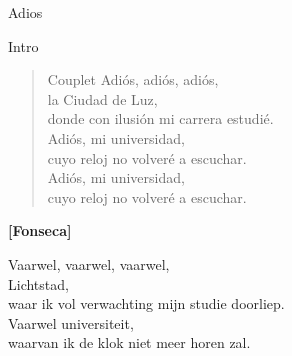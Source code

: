 \begin{song}{Adios}

\begin{instrumental}{Intro}

 \measure{} \measure{} \measure{}  \measure{}    \measure{}  \measure{}  \measure{}  \measure*{}
\end{instrumental}


\begin{verse}{Couplet}
Adiós, adiós, adiós,\\
\chord{}la Ciudad de Luz,\\
donde con ilusión mi carrera estudié.\\
Adiós, mi universidad,\\
cuyo reloj no volveré a escuchar.\\
Adiós, mi universidad,\\
cuyo reloj no volveré a escuchar.\\
\end{verse}
\textbf{[Fonseca]}
\end{song}
\begin{translation}
Vaarwel, vaarwel, vaarwel,\\
Lichtstad,\\
waar ik vol verwachting mijn studie doorliep.\\
Vaarwel universiteit,\\
waarvan ik de klok niet meer horen zal.\\
\end{translation}
